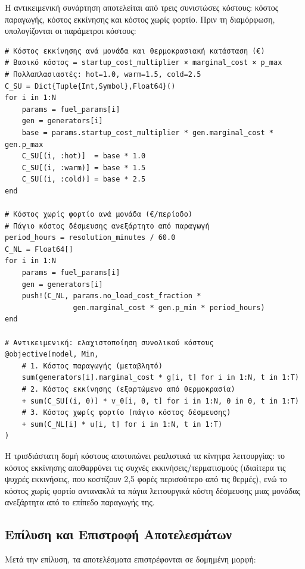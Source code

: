 Η αντικειμενική συνάρτηση αποτελείται από τρεις συνιστώσες κόστους: κόστος παραγωγής, κόστος εκκίνησης και κόστος χωρίς φορτίο. Πριν τη διαμόρφωση, υπολογίζονται οι παράμετροι κόστους:

\begin{samepage}
\begin{verbatim}
# Κόστος εκκίνησης ανά μονάδα και θερμοκρασιακή κατάσταση (€)
# Βασικό κόστος = startup_cost_multiplier × marginal_cost × p_max
# Πολλαπλασιαστές: hot=1.0, warm=1.5, cold=2.5
C_SU = Dict{Tuple{Int,Symbol},Float64}()
for i in 1:N
    params = fuel_params[i]
    gen = generators[i]
    base = params.startup_cost_multiplier * gen.marginal_cost * gen.p_max
    C_SU[(i, :hot)]  = base * 1.0
    C_SU[(i, :warm)] = base * 1.5
    C_SU[(i, :cold)] = base * 2.5
end

# Κόστος χωρίς φορτίο ανά μονάδα (€/περίοδο)
# Πάγιο κόστος δέσμευσης ανεξάρτητο από παραγωγή
period_hours = resolution_minutes / 60.0
C_NL = Float64[]
for i in 1:N
    params = fuel_params[i]
    gen = generators[i]
    push!(C_NL, params.no_load_cost_fraction *
                gen.marginal_cost * gen.p_min * period_hours)
end

# Αντικειμενική: ελαχιστοποίηση συνολικού κόστους
@objective(model, Min,
    # 1. Κόστος παραγωγής (μεταβλητό)
    sum(generators[i].marginal_cost * g[i, t] for i in 1:N, t in 1:T)
    # 2. Κόστος εκκίνησης (εξαρτώμενο από θερμοκρασία)
    + sum(C_SU[(i, θ)] * v_θ[i, θ, t] for i in 1:N, θ in Θ, t in 1:T)
    # 3. Κόστος χωρίς φορτίο (πάγιο κόστος δέσμευσης)
    + sum(C_NL[i] * u[i, t] for i in 1:N, t in 1:T)
)
\end{verbatim}
\end{samepage}

Η τρισδιάστατη δομή κόστους αποτυπώνει ρεαλιστικά τα κίνητρα λειτουργίας: το κόστος εκκίνησης αποθαρρύνει τις συχνές εκκινήσεις/τερματισμούς (ιδιαίτερα τις ψυχρές εκκινήσεις, που κοστίζουν 2,5 φορές περισσότερο από τις θερμές), ενώ το κόστος χωρίς φορτίο αντανακλά τα πάγια λειτουργικά κόστη δέσμευσης μιας μονάδας ανεξάρτητα από το επίπεδο παραγωγής της.

\subsection{Επίλυση και Επιστροφή Αποτελεσμάτων}
\label{subsec:uc-solution}

Μετά την επίλυση, τα αποτελέσματα επιστρέφονται σε δομημένη μορφή:

